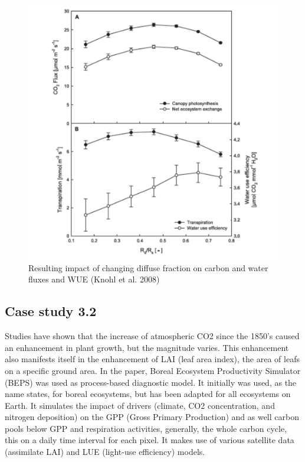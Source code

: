 \documentclass[
  12pt,
  oneside]{book}
\begin{document}
\begin{figure}

{\centering \includegraphics[width=0.8\linewidth]{figures/chap3/f333_knohl2} 

}

\caption{Resulting impact of changing diffuse fraction on carbon and water fluxes and WUE (Knohl et al. 2008)}\label{fig:f333}
\end{figure}

\hypertarget{case-study-3.2}{%
\subsection{Case study 3.2}\label{case-study-3.2}}

Studies have shown that the increase of atmospheric CO2 since the 1850's caused an enhancement in plant growth, but the magnitude varies. This enhancement also manifests itself in the enhancement of LAI (leaf area index), the area of leafs on a specific ground area.
In the paper, Boreal Ecosystem Productivity Simulator (BEPS) was used as process-based diagnostic model. It initially was used, as the name states, for boreal ecosystems, but has been adapted for all ecosystems on Earth. It simulates the impact of drivers (climate, CO2 concentration, and nitrogen deposition) on the GPP (Gross Primary Production) and as well carbon pools below GPP and respiration activities, generally, the whole carbon cycle, this on a daily time interval for each pixel. It makes use of various satellite data (assimilate LAI) and LUE (light-use efficiency) models.
\end{document}
